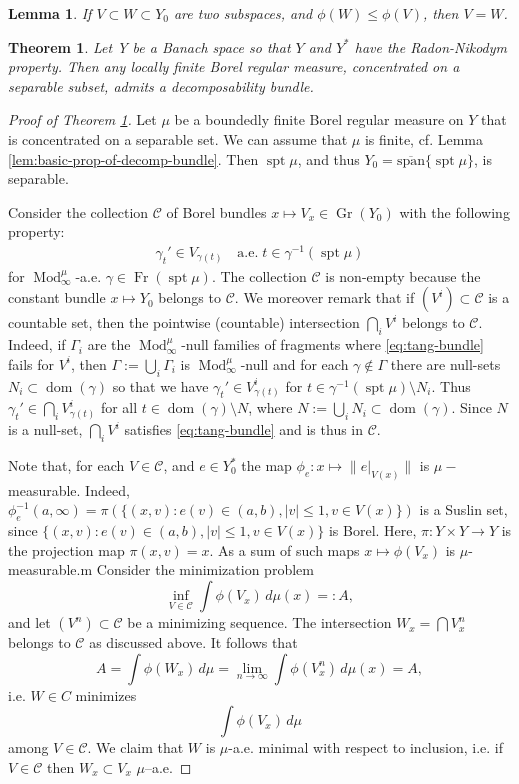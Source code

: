 \documentclass[10pt,a4paper]{amsart}
\newtheorem{lemma}{Lemma}
\newtheorem{theorem}{Theorem}
\newcommand{\Fr}{\operatorname{Fr}}
\newcommand{\Mod}{\operatorname{Mod}}
\newcommand{\dom}{\operatorname{dom}}
\newcommand{\inv}{^{-1}}
\newcommand{\spt}{\operatorname{spt}}
\begin{document}
\begin{lemma}\label{lem:phi-distinguishes-subspaces}
If $V \subset W \subset Y_0$ are two subspaces, and $\phi(W) \le \phi(V)$, then $V = W$.
\end{lemma}

\begin{theorem}\label{thm:decomp-bundle}
Let Y be a Banach space so that $Y$ and $Y^*$ have the Radon-Nikodym property. Then any locally finite Borel regular measure, concentrated on a separable subset, admits a decomposability bundle.
\end{theorem}

\begin{proof}[Proof of Theorem \ref{thm:decomp-bundle}]
Let $\mu$ be a boundedly finite Borel regular measure on $Y$  that is concentrated on a separable set. We can assume that $\mu$ is finite, cf. Lemma \ref{lem:basic-prop-of-decomp-bundle}. Then $\spt\mu$, and thus $Y_0 = \overline{\mbox{span}}\{\spt\mu\}$, is separable.

Consider the collection $\mathcal C$ of Borel bundles $x \mapsto V_x \in \operatorname{Gr}(Y_0)$ with the following property:
\begin{align}\label{eq:tang-bundle}
\gamma_t'\in V_{\gamma(t)}\quad \mbox{a.e.}\; t\in \gamma\inv(\spt\mu)    
\end{align}
for $\Mod_\infty^\mu$-a.e. $\gamma\in \Fr(\spt\mu)$. The collection $\mathcal C$ is non-empty because the constant bundle $x\mapsto Y_0$ belongs to $\mathcal C$. We moreover remark that if $(V^i)\subset \mathcal C$ is a countable set, then the pointwise (countable) intersection $\displaystyle \bigcap_iV^i$ belongs to $\mathcal C$. Indeed, if $\Gamma_i$ are the $\Mod_\infty^\mu$-null families of fragments where \eqref{eq:tang-bundle} fails for $V^i$, then $\Gamma:=\bigcup_i\Gamma_i$ is $\Mod_\infty^\mu$-null and for each $\gamma\notin\Gamma$ there are null-sets $N_i\subset \dom(\gamma)$ so that we have $\gamma_t'\in V_{\gamma(t)}^i$ for $t\in \gamma\inv(\spt\mu)\setminus N_i$.  Thus $\gamma_t'\in \bigcap_iV_{\gamma(t)}^i$ for all $t\in \dom(\gamma)\setminus N$, where $N:=\bigcup_iN_i\subset \dom(\gamma)$. Since $N$ is a null-set, $\bigcap_i V^i$ satisfies \eqref{eq:tang-bundle} and is thus in $\mathcal{C}$.


 Note that, for each $V \in \mathcal C$, and $e\in Y_0^*$ the map $\phi_e:x\mapsto \|e|_{V(x)}\|$ is $\mu-$measurable. Indeed, $\phi_e^{-1}(a,\infty)=\pi(\{(x,v): e(v)\in (a,b), |v|\leq 1, v\in V(x)\})$ is a Suslin set, since $\{(x,v): e(v)\in (a,b), |v|\leq 1, v\in V(x)\}$ is Borel. Here, $\pi:Y\times Y \to Y$ is the projection map $\pi(x,v)=x$. As a sum of such maps $x \mapsto \phi(V_x)$ is $\mu$-measurable.m Consider the minimization problem
\[
\inf_{V \in \mathcal C} \int \phi(V_x)\, d\mu(x) =: A,
\]
and let $(V^n) \subset \mathcal C$ be a minimizing sequence. The intersection $W_x = \bigcap V^n_x$ belongs to $\mathcal C$ as discussed above. It follows
that
\[
A = \int \phi(W_x)\, d\mu = \lim_{n\to\infty} \int \phi(V^n_x)\, d\mu(x) = A,
\]
i.e. $W \in C$ minimizes
\[
\int \phi(V_x)\, d\mu
\]
among $V \in \mathcal C$. We claim that $W$ is $\mu$-a.e. minimal with respect to inclusion, i.e. if $V \in \mathcal C$ then $W_x \subset V_x$ $\mu$–a.e.


\end{proof}
\end{document}

